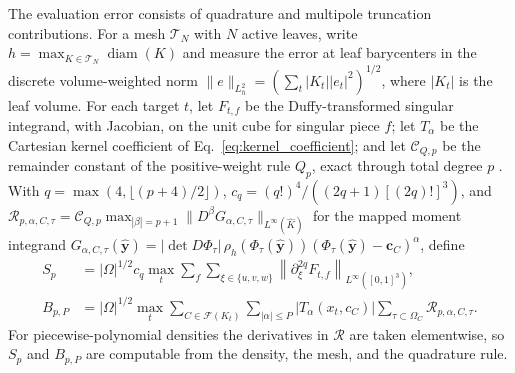 \documentclass[a4paper,pdflatex,sn-mathphys-num]{sn-jnl}
\theoremstyle{thmstyleone}
\begin{document}
The evaluation error consists of quadrature and multipole truncation
contributions. For a mesh \(\mathcal T_N\) with \(N\) active leaves, write
\(h=\max_{K\in\mathcal T_N}\operatorname{diam}(K)\) and measure the error at
leaf barycenters in the discrete volume-weighted norm
\(\|e\|_{L_h^2}=(\sum_t|K_t||e_t|^2)^{1/2}\), where \(|K_t|\) is the leaf
volume. For each target \(t\), let \(F_{t,f}\) be the Duffy-transformed
singular integrand, with Jacobian, on the unit cube for singular piece \(f\);
let \(T_\alpha\) be the Cartesian kernel coefficient of
Eq.~\eqref{eq:kernel_coefficient}; and let \(\mathcal C_{Q,p}\) be the
remainder constant of the positive-weight rule \(Q_p\), exact through total
degree \(p\) \cite{Stroud1971,DavisRabinowitz1984}. With
\(q=\max(4,\lfloor(p+4)/2\rfloor)\), \(c_q=(q!)^4/((2q+1)[(2q)!]^3)\), and
\(\mathcal R_{p,\alpha,C,\tau}=\mathcal C_{Q,p}\max_{|\beta|=p+1}
\|D^\beta G_{\alpha,C,\tau}\|_{L^\infty(\widehat K)}\) for the mapped moment
integrand \(G_{\alpha,C,\tau}(\widehat{\mathbf y})=|\det D\Phi_\tau|\,
\rho_h(\Phi_\tau(\widehat{\mathbf y}))
(\Phi_\tau(\widehat{\mathbf y})-\mathbf c_C)^\alpha\), define
\begin{align}
S_p
&=|\Omega|^{1/2}c_q\max_t
\sum_f\sum_{\xi\in\{u,v,w\}}
\left\|\partial_\xi^{2q}F_{t,f}\right\|_{L^\infty([0,1]^3)},
\label{eq:main_singular_bound}\\
B_{p,P}
&=|\Omega|^{1/2}\max_t
\sum_{C\in\mathcal F(K_t)}\sum_{|\alpha|\le P}
|T_\alpha(x_t,c_C)|
\sum_{\tau\subset\Omega_C}\mathcal R_{p,\alpha,C,\tau}.
\label{eq:main_moment_bound}
\end{align}
For piecewise-polynomial densities the derivatives in \(\mathcal R\) are taken
elementwise, so \(S_p\) and \(B_{p,P}\) are computable from the density, the
mesh, and the quadrature rule.
\end{document}

